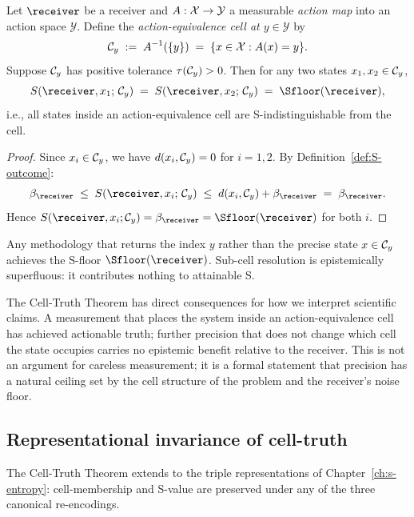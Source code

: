 \begin{theorem}\label{thm:cell-truth}
Let $\receiver$ be a receiver and $A : \mathcal{X} \to \mathcal{Y}$ a measurable \emph{action map} into an action space $\mathcal{Y}$. Define the \emph{action-equivalence cell at $y \in \mathcal{Y}$} by
\[
\mathcal{C}_y \;:=\; A^{-1}(\{y\}) \;=\; \{x \in \mathcal{X} : A(x) = y\}.
\]
Suppose $\mathcal{C}_y$ has positive tolerance $\tau(\mathcal{C}_y) > 0$. Then for any two states $x_1, x_2 \in \mathcal{C}_y$,
\[
S(\receiver, x_1;\, \Cell_y) \;=\; S(\receiver, x_2;\, \Cell_y) \;=\; \Sfloor(\receiver),
\]
i.e., all states inside an action-equivalence cell are S-indistinguishable from the cell.
\end{theorem}

\begin{proof}
Since $x_i \in \mathcal{C}_y$, we have $d(x_i, \mathcal{C}_y) = 0$ for $i = 1, 2$. By Definition~\ref{def:S-outcome}:
\[
\NoiseFloor_\receiver \;\leq\; S(\receiver, x_i;\, \Cell_y) \;\leq\; d(x_i, \Cell_y) + \NoiseFloor_\receiver \;=\; \NoiseFloor_\receiver.
\]
Hence $S(\receiver, x_i; \Cell_y) = \NoiseFloor_\receiver = \Sfloor(\receiver)$ for both $i$.
\end{proof}

\begin{corollary}\label{cor:within-cell}
Any methodology that returns the index $y$ rather than the precise state $x \in \mathcal{C}_y$ achieves the S-floor $\Sfloor(\receiver)$. Sub-cell resolution is epistemically superfluous: it contributes nothing to attainable S.
\end{corollary}

The Cell-Truth Theorem has direct consequences for how we interpret scientific claims. A measurement that places the system inside an action-equivalence cell has achieved actionable truth; further precision that does not change which cell the state occupies carries no epistemic benefit relative to the receiver. This is not an argument for careless measurement; it is a formal statement that precision has a natural ceiling set by the cell structure of the problem and the receiver's noise floor.

\subsection{Representational invariance of cell-truth}

The Cell-Truth Theorem extends to the triple representations of Chapter~\ref{ch:s-entropy}: cell-membership and S-value are preserved under any of the three canonical re-encodings.

